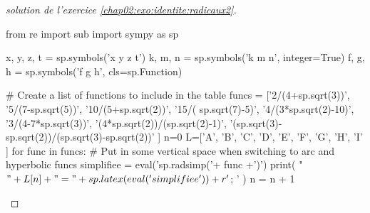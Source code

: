 \begin{proof}[solution de l'exercice \ref{chap02:exo:identite:radicaux2}]
	\begin{pycode}
from re import sub
import sympy as sp

x, y, z, t = sp.symbols('x y z t')
k, m, n = sp.symbols('k m n', integer=True)
f, g, h = sp.symbols('f g h', cls=sp.Function)

# Create a list of functions to include in the table
funcs = ['2/(4+sp.sqrt(3))',
'5/(7-sp.sqrt(5))',
'10/(5+sp.sqrt(2))',
'15/( sp.sqrt(7)-5)',
'4/(3*sp.sqrt(2)-10)',
'3/(4-7*sp.sqrt(3))',
'(4*sp.sqrt(2))/(sp.sqrt(2)-1)',
'(sp.sqrt(3)-sp.sqrt(2))/(sp.sqrt(3)-sp.sqrt(2))' 
]
n=0
L=['A', 'B', 'C', 'D', 'E', 'F', 'G', 'H', 'I'  ]
for func in funcs:
	# Put in some vertical space when switching to arc and hyperbolic funcs
	simplifiee =  eval('sp.radsimp('+ func +')')
	print( "$"+L[n] + " =" + sp.latex( eval('simplifiee') )  + r'$; ' )
	n     = n + 1
\end{pycode}
\end{proof}
%	 

